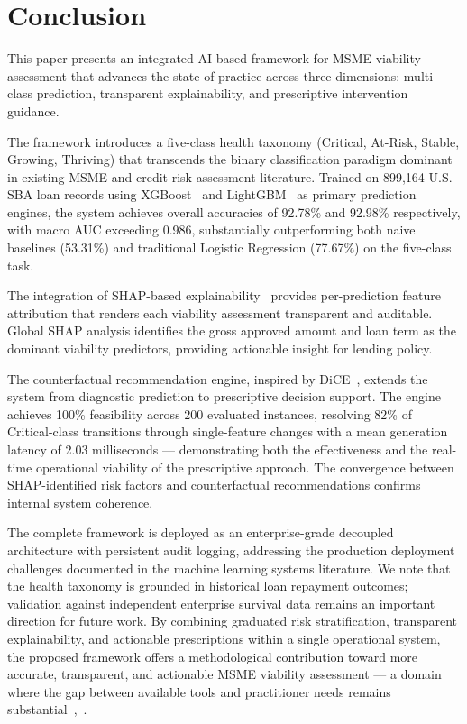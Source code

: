 \section{Conclusion}

This paper presents an integrated AI-based framework for MSME viability assessment that advances the state of practice across three dimensions: multi-class prediction, transparent explainability, and prescriptive intervention guidance.

The framework introduces a five-class health taxonomy (Critical, At-Risk, Stable, Growing, Thriving) that transcends the binary classification paradigm dominant in existing MSME and credit risk assessment literature. Trained on 899,164 U.S. SBA loan records using XGBoost~\cite{10} and LightGBM~\cite{11} as primary prediction engines, the system achieves overall accuracies of 92.78\% and 92.98\% respectively, with macro AUC exceeding 0.986, substantially outperforming both naive baselines (53.31\%) and traditional Logistic Regression (77.67\%) on the five-class task.

The integration of SHAP-based explainability~\cite{17} provides per-prediction feature attribution that renders each viability assessment transparent and auditable. Global SHAP analysis identifies the gross approved amount and loan term as the dominant viability predictors, providing actionable insight for lending policy.

The counterfactual recommendation engine, inspired by DiCE~\cite{20}, extends the system from diagnostic prediction to prescriptive decision support. The engine achieves 100\% feasibility across 200 evaluated instances, resolving 82\% of Critical-class transitions through single-feature changes with a mean generation latency of 2.03 milliseconds --- demonstrating both the effectiveness and the real-time operational viability of the prescriptive approach. The convergence between SHAP-identified risk factors and counterfactual recommendations confirms internal system coherence.

The complete framework is deployed as an enterprise-grade decoupled architecture with persistent audit logging, addressing the production deployment challenges documented in the machine learning systems literature. We note that the health taxonomy is grounded in historical loan repayment outcomes; validation against independent enterprise survival data remains an important direction for future work. By combining graduated risk stratification, transparent explainability, and actionable prescriptions within a single operational system, the proposed framework offers a methodological contribution toward more accurate, transparent, and actionable MSME viability assessment --- a domain where the gap between available tools and practitioner needs remains substantial~\cite{6},~\cite{7}.
